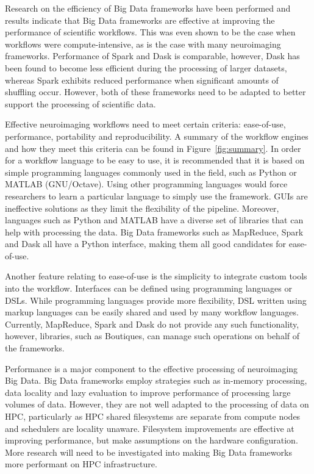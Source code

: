         Research on the efficiency of Big Data frameworks have been performed 
        and results indicate that Big Data frameworks are effective at 
        improving the performance of scientific workflows. This was even shown
        to be the case when workflows were compute-intensive, as is the case 
        with many neuroimaging frameworks. Performance of Spark and Dask is 
        comparable, however, Dask has been found to become less efficient during 
        the processing of larger datasets, whereas Spark exhibits reduced 
        performance when significant amounts of shuffling occur. However, both
        of these frameworks need to be adapted to better support the processing
        of scientific data. 

        Effective neuroimaging workflows need to meet certain criteria: 
        ease-of-use, performance, portability and reproducibility. A summary of
        the workflow engines and how they meet this criteria can be found in Figure~\ref{fig:summary}. In order for
        a workflow language to be easy to use, it is recommended that it is 
        based on simple programming languages commonly used in the field, such 
        as Python or MATLAB (GNU/Octave). Using other programming languages 
        would force researchers to learn a particular language to simply use the
        framework. GUIs are ineffective solutions as they limit the flexibility
        of the pipeline. Moreover, languages such as Python and MATLAB have a 
        diverse set of libraries that can help with processing the data. Big
        Data frameworks such as MapReduce, Spark and Dask all have a Python 
        interface, making them all good candidates for ease-of-use.


        Another feature relating to ease-of-use is the simplicity to integrate
        custom tools into the workflow. Interfaces can be defined using programming
        languages or DSLs. While programming languages provide more flexibility,
        DSL written using markup languages can be easily shared and used by 
        many workflow languages. Currently, MapReduce, Spark and Dask do not
        provide any such functionality, however, libraries, such as Boutiques,
        can manage such operations on behalf of the frameworks.


        Performance is a major component to the effective processing of 
        neuroimaging Big Data. Big Data frameworks employ strategies such as 
        in-memory processing, data locality and lazy evaluation to improve
        performance of processing large volumes of data. However, they are not
        well adapted to the processing of data on HPC, particularly as HPC 
        shared filesystems are separate from compute nodes and schedulers are 
        locality unaware. Filesystem improvements are effective at improving 
        performance, but make assumptions on the hardware configuration. More
        research will need to be investigated into making Big Data frameworks
        more performant on HPC infrastructure.

